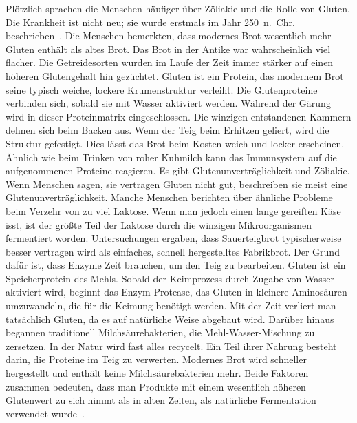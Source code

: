 Plötzlich sprachen die Menschen häufiger über Zöliakie
und die Rolle von Gluten. Die Krankheit ist nicht neu; sie wurde erstmals
im Jahr \num{250}~n.~Chr. beschrieben~\cite{coeliac+disease}. Die Menschen
bemerkten, dass modernes Brot wesentlich mehr Gluten enthält als
altes Brot. Das Brot in der Antike war wahrscheinlich viel flacher.
Die Getreidesorten wurden im Laufe der Zeit immer stärker auf einen höheren
Glutengehalt hin gezüchtet. Gluten ist ein Protein, das modernem
Brot seine typisch weiche, lockere Krumenstruktur verleiht. Die
Glutenproteine verbinden sich, sobald sie mit Wasser aktiviert werden.
Während der Gärung wird  in dieser
Proteinmatrix eingeschlossen. Die winzigen entstandenen Kammern dehnen sich
beim Backen aus. Wenn der Teig beim Erhitzen geliert,
wird die Struktur gefestigt. Dies lässt das Brot beim Kosten
weich und locker erscheinen. Ähnlich wie beim Trinken von roher Kuhmilch
kann das Immunsystem auf die aufgenommenen Proteine reagieren.
Es gibt Glutenunverträglichkeit
und Zöliakie. Wenn Menschen sagen, sie vertragen
Gluten nicht gut, beschreiben sie meist eine Glutenunverträglichkeit.
Manche Menschen berichten über ähnliche Probleme beim Verzehr
von zu viel Laktose. Wenn man jedoch einen lange gereiften Käse isst,
ist der größte Teil der Laktose durch
die winzigen Mikroorganismen fermentiert worden. Untersuchungen ergaben,
dass Sauerteigbrot typischerweise besser vertragen wird
als einfaches, schnell hergestelltes Fabrikbrot. Der
Grund dafür ist, dass Enzyme Zeit brauchen, um den Teig zu bearbeiten.
Gluten ist ein Speicherprotein des Mehls. Sobald
der Keimprozess durch Zugabe von Wasser aktiviert wird, beginnt das Enzym Protease,
das Gluten in kleinere Aminosäuren umzuwandeln,
die für die Keimung benötigt werden. Mit der Zeit verliert man tatsächlich
Gluten, da es auf natürliche Weise abgebaut wird. Darüber hinaus begannen
traditionell Milchsäurebakterien, die Mehl-Wasser-Mischung zu zersetzen.
In der Natur wird fast alles recycelt.
Ein Teil ihrer Nahrung besteht darin, die Proteine im Teig zu verwerten.
Modernes Brot wird schneller hergestellt und enthält keine Milchsäurebakterien mehr.
Beide Faktoren zusammen bedeuten, dass man Produkte
mit einem wesentlich höheren Glutenwert zu sich nimmt als in alten Zeiten,
als natürliche Fermentation verwendet wurde~\cite{raffaella+di+cagno}.

